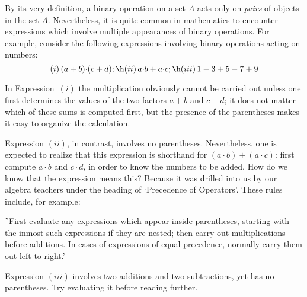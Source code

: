 {\V

        By its very definition, a binary operation on a set $A$ acts only on {\em pairs} of objects in the set $A$.
    Nevertheless, it is quite common in mathematics to encounter expressions which involve multiple appearances of binary operations.
    For example, consider the following expressions involving binary operations acting on numbers:
        \begin{displaymath}
        (i)\,   (a+b){\cdot}(c+d); \h
        (ii)\,  a{\cdot}b + a{\cdot}c; \h
        (iii)\, 1 - 3 + 5 - 7 + 9
        \end{displaymath}

        In Expression~$(i)$ the multiplication obviously cannot be carried out unless one first determines the values of the two factors $a+b$ and $c+d$;
    it does not matter which of these sums is computed first, but the presence of the parentheses makes it easy to organize the calculation.

        Expression $(ii)$, in contrast, involves no parentheses. Nevertheless, one is expected to realize that this expression is shorthand for
    $(a{\cdot}b) + (a{\cdot}c)$: first compute $a{\cdot}b$ and $c{\cdot}d$, in order to know the numbers to be added.
    How do we know that the expression means this? Because it was drilled into us by our algebra teachers under the heading of `Precedence of Operators'.
    These rules include, for example:

\VA

        \h `First evaluate any expressions which appear inside parentheses, starting with the inmost such expressions if they are nested;
    then carry out multiplications before additions. In cases of expressions of equal precedence, normally carry them out left to right.'

\VA

        Expression $(iii)$ involves two additions and two subtractions, yet has no parentheses. Try evaluating it before reading further.

}
